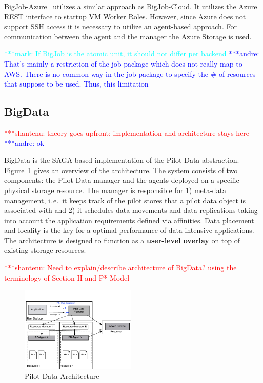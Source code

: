 \documentclass[conference,final]{IEEEtran}
\newcommand{\jhanote}[1]{ {\textcolor{red} { ***shantenu: #1 }}}
\newcommand{\alnote}[1]{ {\textcolor{blue} { ***andre: #1 }}}
\newcommand{\msnote}[1]{ {\textcolor{cyan} { ***mark: #1 }}}
\newcommand{\alnote}[1]{}
\newcommand{\jhanote}[1]{}
\begin{document}
BigJob-Azure~\cite{10.1109/CloudCom.2010.85} utilizes a similar approach as
BigJob-Cloud. It utilizes the Azure REST interface to startup VM Worker Roles.
However, since Azure does not support SSH access it is necessary to utilize an
agent-based approach. For communication between the agent and the manager the
Azure Storage is used.

\msnote{If BigJob is the atomic unit, it should not differ per
  backend}\alnote{That's mainly a restriction of the job package which
  does not really map to AWS. There is no common way in the job
  package to specify the \# of resources that suppose to be
  used. Thus, this limitation}


\subsection{BigData}

\jhanote{theory goes upfront; implementation and architecture stays
  here} \alnote{ok}

BigData is the SAGA-based implementation of the Pilot Data abstraction.
Figure~\ref{fig:figures_distributed_pilot_job} gives an overview of the
architecture. The system consists of two components: the Pilot Data manager and
the agents deployed on a specific physical storage resource. The manager is
responsible for 1) meta-data management, i.\,e.\ it keeps track of the pilot
stores that a pilot data object is associated with and 2) it schedules data
movements and data replications taking into account the application requirements 
defined via affinities. Data placement and locality is the key for a optimal 
performance of data-intensive applications. The architecture is designed to 
function as a \textbf{user-level overlay} on top of existing storage resources.


\jhanote{Need to explain/describe architecture of BigData? using the
  terminology of Section II and P*-Model}

\begin{figure}[htbp]
    \centering
        \includegraphics[width=0.49\textwidth]{figures/pilot-data-manager.pdf}
    \caption{Pilot Data Architecture}
    \label{fig:figures_distributed_pilot_job}
\end{figure}
\end{document}
